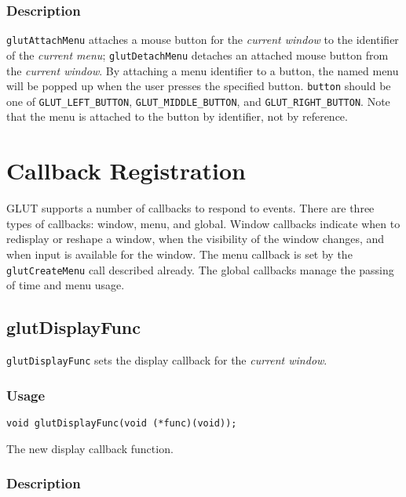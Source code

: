 \subsubsection*{Description}

{\tt glutAttachMenu} attaches a mouse button for the {\em current window} to the identifier of
the {\em current menu}; {\tt glutDetachMenu} detaches an attached mouse button from the
{\em current window}.  By attaching a menu identifier to a button, the named menu
will be popped up when the user presses the specified button.
{\tt button} should be one of {\tt GLUT\_LEFT\_BUTTON}, {\tt GLUT\_MIDDLE\_BUTTON},
and {\tt GLUT\_RIGHT\_BUTTON}.  Note that the menu is attached to the button by
identifier, not by reference.

\section{Callback Registration}

GLUT supports a number of callbacks to respond to events.  There are
three types of callbacks:  window, menu, and global.   Window callbacks
indicate when to redisplay or reshape a window, when the visibility of
the window changes, and when input is available for the window.
The menu callback is set by the {\tt glutCreateMenu} call described already.
The global callbacks manage the passing of time and menu usage.

\subsection{glutDisplayFunc}

{\tt glutDisplayFunc} sets the display callback for the {\em current window}.

\subsubsection*{Usage}

\begin{verbatim}
void glutDisplayFunc(void (*func)(void));
\end{verbatim}
\begin{description}
\itemsep 0in
\item[\tt func]
The new display callback function.
\end{description}

\subsubsection*{Description}

